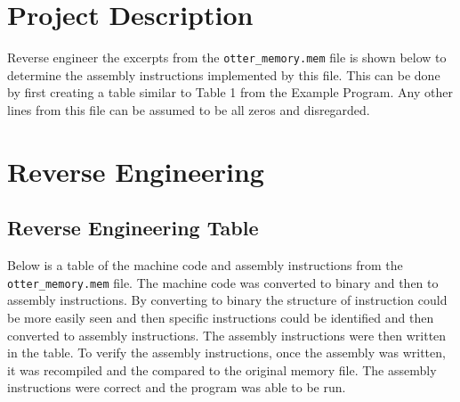 \documentclass[
    a4paper, %
	12pt, %
    ]{CSSullivanBusinessReport}
\begin{document}
\begin{fullwidth} %

\section{Project Description} %

Reverse engineer the excerpts from the \verb|otter_memory.mem| file is shown below to determine the assembly instructions implemented by this file. This can be done by first creating a table similar to Table 1 from the Example Program. Any other lines from this file can be assumed to be all zeros and disregarded. 

\section{Reverse Engineering} %

\subsection{Reverse Engineering Table} %
Below is a table of the machine code and assembly instructions from the \verb|otter_memory.mem| file. The machine code was converted to binary and then to assembly instructions. By converting to binary the structure of instruction could be more easily seen and then specific instructions could be identified and then converted to assembly instructions. The assembly instructions were then written in the table. To verify the assembly instructions, once the assembly was written, it was recompiled and the compared to the original memory file. The assembly instructions were correct and the program was able to be run.


\end{fullwidth}
\end{document}
